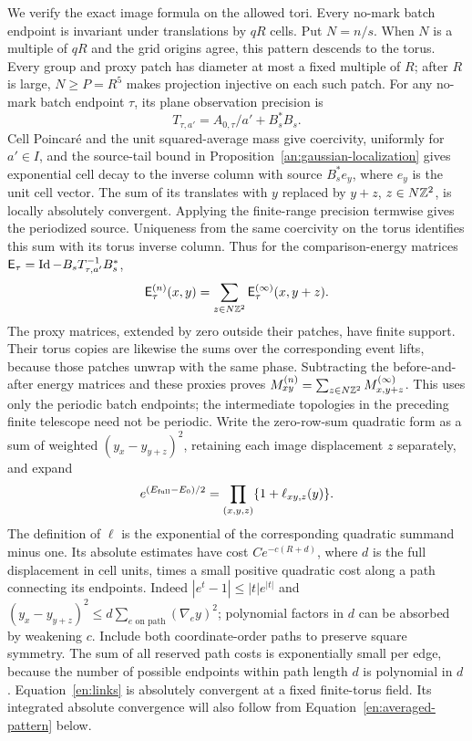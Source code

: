 We verify the exact image formula on the allowed tori.  Every
no-mark batch endpoint is invariant under translations by $qR$ cells.
Put $N=n/s$.  When $N$ is a multiple of $qR$ and the grid origins
agree, this pattern descends to the torus.  Every group and proxy
patch has diameter at most a fixed multiple of $R$; after $R$ is
large, $N\ge P=R^5$ makes projection injective on each such patch.
For any no-mark batch endpoint $\tau$, its plane observation
precision is
\[
 T_{\tau,a'}=A_{0,\tau}/a'+B_s^*B_s .
\]
Cell Poincar\'e and the unit squared-average mass give coercivity,
uniformly for $a'\in I$, and the source-tail bound in
Proposition~\ref{an:gaussian-localization} gives exponential cell
decay to the inverse column with source $B_s^*e_y$, where $e_y$ is
the unit cell vector.
The sum of its translates with $y$ replaced by
$y+z$, $z\in N\mathbb Z^2$, is locally absolutely convergent.  Applying
the finite-range precision termwise gives the periodized source.
Uniqueness from the same coercivity on the torus identifies this
sum with its torus inverse column.  Thus for the comparison-energy
matrices $\mathsf E_\tau=\operatorname{Id}-B_sT_{\tau,a'}^{-1}B_s^*$,
\[
 \mathsf E_\tau^{(n)}(x,y)
   =\sum_{z\in N\mathbb Z^2}\mathsf E_\tau^{(\infty)}(x,y+z).
\]
The proxy matrices, extended by zero outside their patches, have
finite support.  Their torus copies are likewise the sums over
the corresponding event lifts, because those patches unwrap with
the same phase.  Subtracting the before-and-after energy matrices
and these proxies proves
$M^{(n)}_{xy}=\sum_{z\in N\mathbb Z^2}M^{(\infty)}_{x,y+z}$.
This uses only the periodic batch endpoints; the intermediate
topologies in the preceding finite telescope need not be periodic.
Write the zero-row-sum
quadratic form as a sum of weighted $(y_x-y_{y+z})^2$, retaining each
image displacement $z$ separately, and expand
\begin{equation}\label{en:links}
       e^{(E_{\rm full}-E_0)/2}
       =\prod_{(x,y,z)}\{1+\ell_{xy,z}(y)\}.
\end{equation}
The definition of $\ell$ is the exponential of the corresponding
quadratic summand minus one.  Its absolute estimates have cost
$Ce^{-c(R+d)}$, where $d$ is the full displacement in cell units,
times a small positive quadratic cost along a path connecting its
endpoints.  Indeed $|e^t-1|\leq |t|e^{|t|}$ and
$(y_x-y_{y+z})^2\leq d\sum_{e\text{ on path}}(\nabla_e y)^2$;
polynomial factors in $d$ can be absorbed by weakening $c$.
Include both coordinate-order paths to preserve square symmetry.
The sum of all reserved path costs is exponentially small per edge,
because the number of possible endpoints within path length $d$ is
polynomial in $d$.  Equation~\eqref{en:links} is absolutely convergent
at a fixed finite-torus field.  Its integrated absolute convergence
will also follow from Equation~\eqref{en:averaged-pattern} below.

